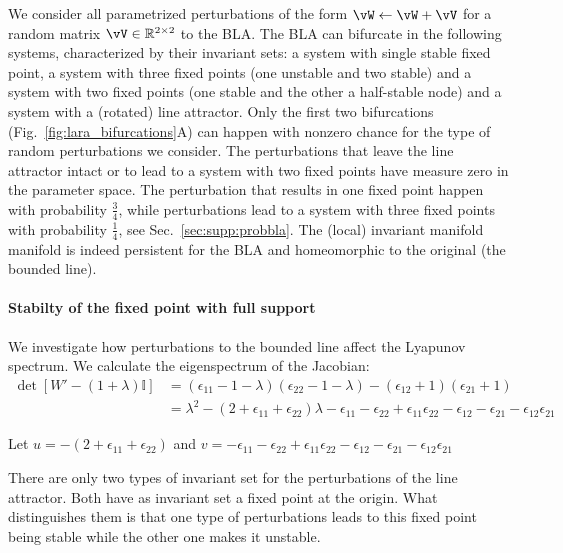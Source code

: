 \documentclass{article} %
\newcounter{ct}
\theoremstyle{definition}
\theoremstyle{remark}
\begin{document}
We consider all parametrized perturbations of the form \( \vW \leftarrow \vW + \vV\) for a random matrix \(\vV\in \mathbb{R}^{2\times 2}\) to the BLA.
The BLA can bifurcate in the following systems, characterized by their invariant sets: a system with single stable fixed point, a system with three fixed points (one unstable and two stable) and  a system with two fixed points (one stable and the other a half-stable node) and a system with a (rotated) line attractor.
Only the first two bifurcations (Fig.~\ref{fig:lara_bifurcations}A) can happen with nonzero chance for the type of random perturbations we consider.
The perturbations that leave the line attractor intact or to lead to a system with two fixed points have measure zero in the parameter space.
The perturbation that results in one fixed point happen with probability \(\frac{3}{4}\), while perturbations lead to a system with three fixed points with probability \(\frac{1}{4}\), see Sec.~\ref{sec:supp:probbla}.
The (local) %
 invariant manifold manifold is indeed persistent for the BLA and homeomorphic to the original (the bounded line).



\paragraph{Stabilty of the fixed point with full support}
We investigate how perturbations to the bounded line affect the Lyapunov spectrum.
We calculate the eigenspectrum of the Jacobian:
\begin{align*}
\det [W' -(1+\lambda)\mathbb{I}] &= (\epsilon_{11}-1-\lambda)(\epsilon_{22}-1-\lambda)-(\epsilon_{12}+1)(\epsilon_{21}+1)\\
&=\lambda^2 - (2+\epsilon_{11}+\epsilon_{22})\lambda -\epsilon_{11}-\epsilon_{22}+\epsilon_{11}\epsilon_{22} -\epsilon_{12} - \epsilon_{21} - \epsilon_{12}\epsilon_{21}
\end{align*}

Let
\(u=- (2+\epsilon_{11}+\epsilon_{22})\)
and
\(v=-\epsilon_{11}-\epsilon_{22}+\epsilon_{11}\epsilon_{22} -\epsilon_{12} - \epsilon_{21} - \epsilon_{12}\epsilon_{21}\)

There are only two types of invariant set for the perturbations of the line attractor. Both have as invariant set a fixed point at the origin. What distinguishes them is that one type of perturbations leads to this fixed point being stable while the other one makes it unstable.
\end{document}
